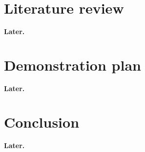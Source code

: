 \documentclass[onecolumn,10pt]{IEEEtran}
\newcommand{\myroot}{../}
\newcommand{\Later}{\textbf{Later.}}
\begin{document}
\section{Literature review}
\Later

\section{Demonstration plan}
\Later

\section{Conclusion}
\Later



\end{document}
